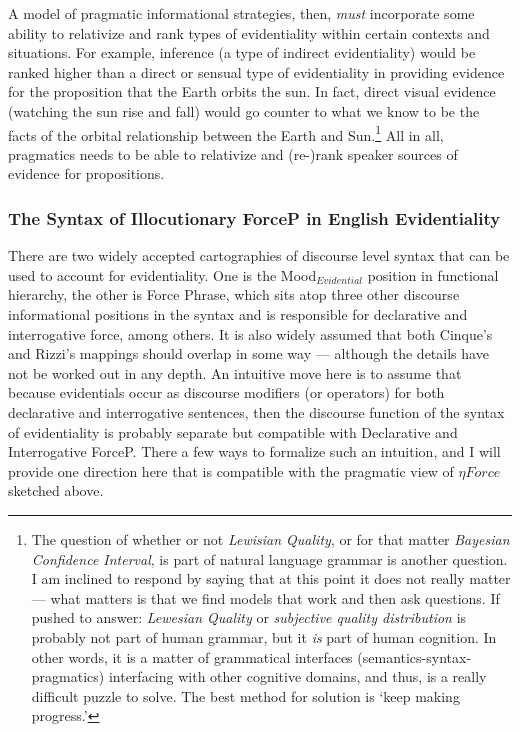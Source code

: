 \documentclass{article}
\begin{document}
A model of pragmatic informational strategies, then, {\sl must} incorporate some ability to relativize and rank types of evidentiality within certain contexts and situations. For example, inference (a type of indirect evidentiality) would be ranked higher than a direct or sensual type of evidentiality in providing evidence for the proposition that the Earth orbits the sun. In fact, direct visual evidence (watching the sun rise and fall) would go counter to what we know to be the facts of the orbital relationship between the Earth and Sun.\footnote{The question of whether or not {\sl Lewisian Quality}, or for that matter {\sl Bayesian Confidence Interval}, is part of natural language grammar is another question. I am inclined to respond by saying that at this point it does not really matter --- what matters is that we find models that work and then ask questions. If pushed to answer: {\sl Lewesian Quality} or {\sl subjective quality distribution} is probably not part of human grammar, but it {\sl is} part of human cognition. In other words, it is a matter of grammatical interfaces (semantics-syntax-pragmatics) interfacing with other cognitive domains, and thus, is a really difficult puzzle to solve. The best method for solution is `keep making progress.'} All in all, pragmatics needs to be able to relativize and (re-)rank speaker sources of evidence for propositions. 

\subsubsection{The Syntax of Illocutionary ForceP in English Evidentiality}
There are two widely accepted cartographies of discourse level syntax that can be used to account for evidentiality. One is the Mood$_{Evidential}$ position in  functional hierarchy, the other is  Force Phrase, which sits atop three other discourse informational positions in the syntax and is responsible for declarative and interrogative force, among others. It is also widely assumed that both Cinque's and Rizzi's mappings should overlap in some way --- although the details have not be worked out in any depth. An intuitive move here is to assume that because evidentials occur as discourse modifiers (or operators) for both declarative and interrogative sentences, then the discourse function of the syntax of evidentiality is probably separate but compatible with Declarative and Interrogative ForceP. There a few ways to formalize such an intuition, and I will provide one direction here that is compatible with the pragmatic view of $\eta Force$ sketched above.
\end{document}
